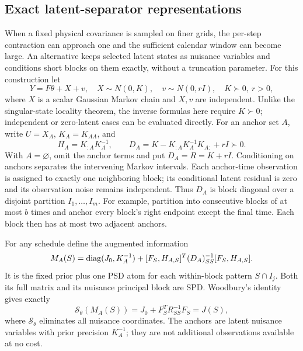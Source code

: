 \subsection{Exact latent-separator representations}
\label{subsec:separators}
When a fixed physical covariance is sampled on finer grids, the per-step
contraction can approach one and the sufficient calendar window can become
large. An alternative keeps selected latent states as nuisance variables
and conditions short blocks on them exactly, without a truncation parameter.
For this construction let
\begin{equation}\label{eq:separator-model}
 Y=F\theta+X+v,\quad X\sim N(0,K),\quad
 v\sim N(0,rI),\quad K\succ0,\ r>0,
\end{equation}
where $X$ is a scalar Gaussian Markov chain and $X,v$ are independent.
Unlike the singular-state locality theorem, the inverse formulas here require
$K\succ0$; independent or zero-latent cases can be evaluated directly.
For an anchor set $A$, write $U=X_A$, $K_A=K_{AA}$, and
\begin{equation}\label{eq:separator-conditional}
 H_A=K_{:A}K_A^{-1},\qquad
 D_A=K-K_{:A}K_A^{-1}K_{A:}+rI\succ0.
\end{equation}
With $A=\varnothing$, omit the anchor terms and put $D_A=R=K+rI$.
Conditioning on anchors separates the intervening Markov intervals.
Each anchor-time observation is assigned to exactly one neighboring block;
its conditional latent residual is zero and its observation noise remains
independent. Thus $D_A$ is block diagonal over a disjoint partition
$I_1,\ldots,I_m$. For example, partition into consecutive blocks of at most
$b$ times and anchor every block's right endpoint except the final time.
Each block then has at most two adjacent anchors.

For any schedule define the augmented information
\begin{equation}\label{eq:separator-augmented}
 M_A(S)=\operatorname{diag}(J_0,K_A^{-1})+
 [F_S,H_{A,S}]^T(D_A)_{SS}^{-1}[F_S,H_{A,S}].
\end{equation}
It is the fixed prior plus one PSD atom for each within-block pattern
$S\cap I_j$. Both its full matrix and its nuisance principal block are SPD.
Woodbury's identity gives exactly
\begin{equation}\label{eq:separator-schur}
 \mathcal S_\theta(M_A(S))=J_0+F_S^TR_{SS}^{-1}F_S=J(S),
\end{equation}
where $\mathcal S_\theta$ eliminates all nuisance coordinates. The anchors
are latent nuisance variables with prior precision $K_A^{-1}$; they are
not additional observations available at no cost.

